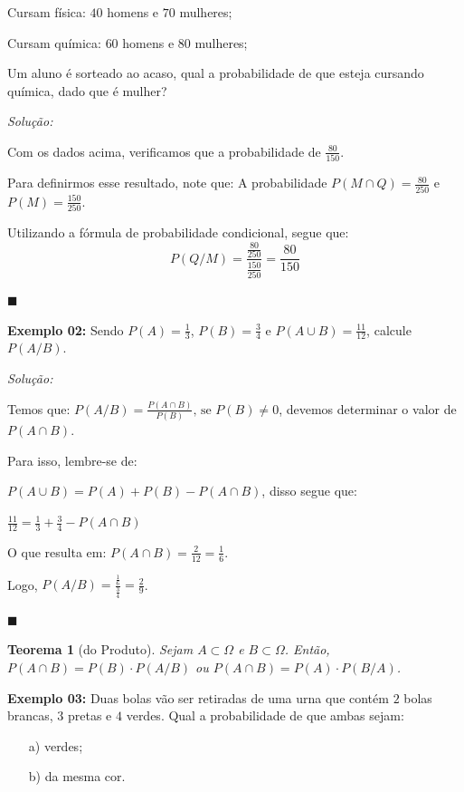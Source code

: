 \documentclass[oneside,a4paper,12pt]{article}
\newtheorem{theorem}{Teorema}[section]
\begin{document}
Cursam física: $40$ homens e $70$ mulheres;

Cursam química: $60$ homens e $80$ mulheres;

Um aluno é sorteado ao acaso, qual a probabilidade de que esteja cursando química, dado que é mulher?

{\it Solução:}

Com os dados acima, verificamos que a probabilidade de $\displaystyle \frac{80}{150}$.

Para definirmos esse resultado, note que:
A probabilidade $P(M \cap Q) = \displaystyle \frac{80}{250}$ e $P(M) = \displaystyle \frac{150}{250}$.

Utilizando a fórmula de probabilidade condicional, segue que:
$$P(Q/M) = \frac{\frac{80}{250}}{\frac{150}{250}} = \frac{80}{150}$$

\begin{flushright}
	$\blacksquare$
\end{flushright}


{\bf Exemplo 02:} Sendo $P(A) = \displaystyle \frac{1}{3}$, $P(B) = \displaystyle \frac{3}{4}$ e $P(A \cup B) = \displaystyle \frac{11}{12}$, calcule $P(A/B)$.

{\it Solução:}

Temos que: 
$P(A/B) = \frac{P(A \cap B)}{P(B)} \text{, se } P(B) \neq 0$, devemos determinar o valor de $P(A \cap B)$.

Para isso, lembre-se de:

$P(A \cup B) = P(A) + P(B) - P(A \cap B)$, disso segue que:

$\displaystyle \frac{11}{12} = \displaystyle \frac{1}{3} + \displaystyle \frac{3}{4} - P(A \cap B)$

O que resulta em:
$P(A \cap B) = \displaystyle \frac{2}{12} = \displaystyle \frac{1}{6}$.

Logo, $P(A/B) = \displaystyle \frac{\frac{1}{6}}{\frac{3}{4}} = \displaystyle \frac{2}{9}$.

\begin{flushright}
	$\blacksquare$
\end{flushright}

\begin{theorem}[do Produto]
	Sejam $A \subset \Omega$ e $B \subset \Omega$. Então, $P(A \cap B) = P(B) \cdot P(A/B)$ ou $P(A \cap B) = P(A) \cdot P(B/A)$.
\end{theorem}

{\bf Exemplo 03:} Duas bolas vão ser retiradas de uma urna que contém $2$ bolas brancas, $3$ pretas e $4$ verdes. Qual a probabilidade de que ambas sejam:
\begin{itemize}
	\item[a)] verdes;
	\item[b)] da mesma cor.
\end{itemize}
\end{document}
